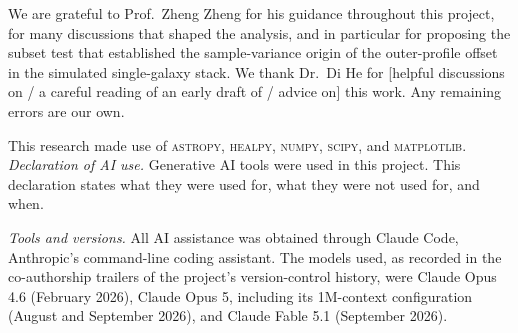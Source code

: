 \documentclass[preprint]{aastex701}
\begin{document}
\begin{acknowledgments}
We are grateful to Prof.\ Zheng Zheng for his guidance throughout this
project, for many discussions that shaped the analysis, and in particular
for proposing the subset test that established the sample-variance origin
of the outer-profile offset in the simulated single-galaxy stack. We thank
Dr.\ Di He for [helpful discussions on / a careful reading of an early draft
of / advice on] this work. %
Any remaining errors are our own.




This research made use of \textsc{astropy}, \textsc{healpy}, \textsc{numpy},
\textsc{scipy}, and \textsc{matplotlib}. %
\emph{Declaration of AI use.} Generative AI tools were used in this project.
This declaration states what they were used for, what they were not used for,
and when.

\emph{Tools and versions.} All AI assistance was obtained through Claude Code,
Anthropic's command-line coding assistant. The models used, as recorded in the
co-authorship trailers of the project's version-control history, were Claude
Opus 4.6 (February 2026), Claude Opus 5, including its 1M-context configuration
(August and September 2026), and Claude Fable 5.1 (September 2026).


\end{acknowledgments}
\end{document}
